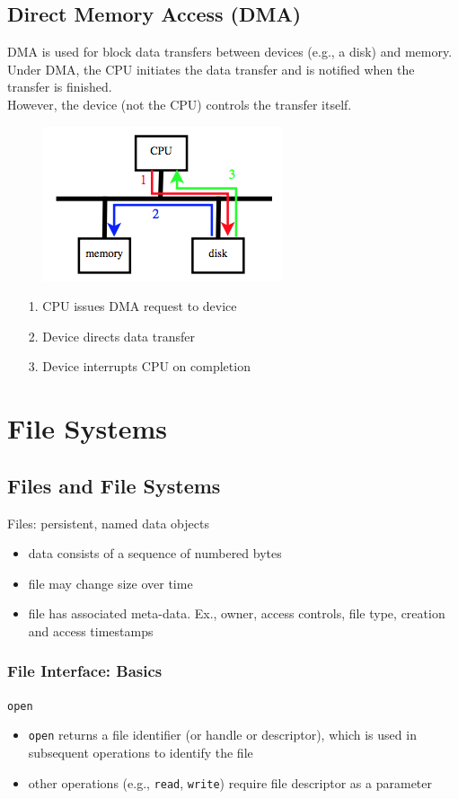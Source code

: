 \documentclass[12pt]{article}
\theoremstyle{plain}
\theoremstyle{definition}
\begin{document}
\subsection{Direct Memory Access (DMA)}
DMA is used for block data transfers between devices (e.g., a disk) and memory. \\

Under DMA, the CPU initiates the data transfer and is notified when the transfer is finished. \\
However, the device (not the CPU) controls the transfer itself.
\begin{figure}[H]
  \centering
  \includegraphics[scale=0.7]{pictures/dma.png}
\end{figure}
\begin{itemize}
  \item[1.] CPU issues DMA request to device
  \item[2.] Device directs data transfer
  \item[3.] Device interrupts CPU on completion
\end{itemize}


\newpage
\section{File Systems}
\subsection{Files and File Systems}
Files: persistent, named data objects
\begin{itemize}
  \item data consists of a sequence of numbered bytes
  \item file may change size over time
  \item file has associated meta-data. Ex., owner, access controls, file type, creation and access timestamps
\end{itemize}

\subsubsection{File Interface: Basics}
\texttt{open}
\begin{itemize}
  \item \texttt{open} returns a file identifier (or handle or descriptor), which is used in subsequent operations to identify the file
  \item other operations (e.g., \texttt{read}, \texttt{write}) require file descriptor as a parameter
\end{itemize}
\end{document}
